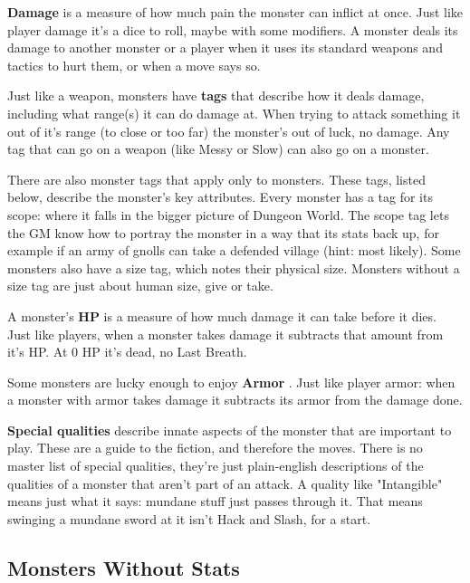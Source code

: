        

         {\bf Damage}  is a measure of how much pain the monster can inflict at once. Just like player damage it's a dice to roll, maybe with some modifiers. A monster deals its damage to another monster or a player when it uses its standard weapons and tactics to hurt them, or when a move says so.

       

Just like a weapon, monsters have {\bf tags}  that describe how it deals damage, including what range(s) it can do damage at. When trying to attack something it out of it's range (to close or too far) the monster's out of luck, no damage. Any tag that can go on a weapon (like Messy or Slow) can also go on a monster.

       

There are also monster tags that apply only to monsters. These tags, listed below, describe the monster's key attributes. Every monster has a tag for its scope: where it falls in the bigger picture of Dungeon World. The scope tag lets the GM know how to portray the monster in a way that its stats back up, for example if an army of gnolls can take a defended village (hint: most likely). Some monsters also have a size tag, which notes their physical size. Monsters without a size tag are just about human size, give or take.

       

A monster's {\bf HP}  is a measure of how much damage it can take before it dies. Just like players, when a monster takes damage it subtracts that amount from it's HP. At 0 HP it's dead, no Last Breath.

       

Some monsters are lucky enough to enjoy {\bf Armor} . Just like player armor: when a monster with armor takes damage it subtracts its armor from the damage done.

       

         {\bf Special qualities}  describe innate aspects of the monster that are important to play. These are a guide to the fiction, and therefore the moves. There is no master list of special qualities, they're just plain-english descriptions of the qualities of a monster that aren't part of an attack. A quality like "Intangible" means just what it says: mundane stuff just passes through it. That means swinging a mundane sword at it isn't Hack and Slash, for a start.

       
\subsection{Monsters Without Stats}    
       

